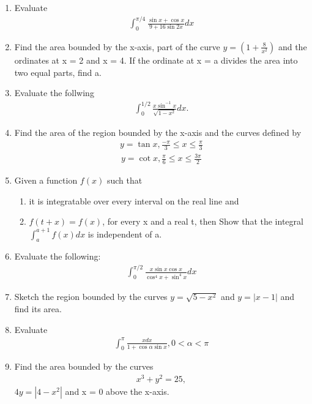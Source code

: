 \begin{enumerate}[label=\arabic*.,ref=\thesubsection.\theenumi]
\item Evaluate
\begin{align*}
\int_{0}^{\pi/4}\frac{\sin x + \cos x}{9 + 16\sin 2x}dx
\end{align*}

\item Find the area bounded by the x-axis, part of the curve $y = (1 + \frac{8}{x^2})$ and the ordinates at x = 2 and x = 4. If the ordinate at x = a divides the area into two equal parts, find a.

\item Evaluate the follwing
\begin{align*}
\int_{0}^{1/2}\frac{x\sin^{-1}x}{\sqrt{1 - x^2}}dx.
\end{align*}

\item Find the area of the region bounded by the x-axis and the curves defined by
\begin{align*}
y = \tan x, \frac{-\pi}{3} \leq x \leq \frac{\pi}{3}
\end{align*}
\begin{align*}
y = \cot x, \frac{\pi}{6} \leq x \leq \frac{3\pi}{2}
\end{align*}

\item Given a function $f(x)$ such that
\begin{enumerate}
\item it is integratable over every interval on the real line and
\item $f(t + x) = f(x)$, for every x and a real t, then Show that the integral $\int_{a}^{a + 1}f(x)dx$ is independent of a.
\end{enumerate}

\item Evaluate the following:
\begin{align*}
\int_{0}^{\pi/2}\frac{x\sin x \cos x}{\cos^{4}x + \sin^{4}x}dx
\end{align*}

\item Sketch the region bounded by the curves $y = \sqrt{5 - x^{2}}$ and $y = |x - 1|$ and find its area.

\item Evaluate
\begin{align*}
\int_{0}^{\pi}\frac{x dx}{1 + \cos \alpha \sin x}, 0 < \alpha < \pi
\end{align*}

\item Find the area bounded by the curves 
\begin{align}
x^3 + y^{2} = 25,
\end{align}
$4y = |4 - x^{2}|$ and x = 0 above the x-axis.


\end{enumerate}

